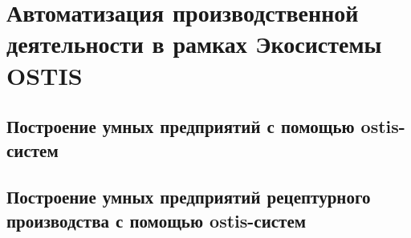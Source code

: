 \chapter{Автоматизация производственной деятельности в рамках Экосистемы OSTIS}
\label{chapter_enterprise}


\section{Построение умных предприятий с помощью ostis-систем}
\section{Построение умных предприятий рецептурного производства с помощью ostis-систем}

%